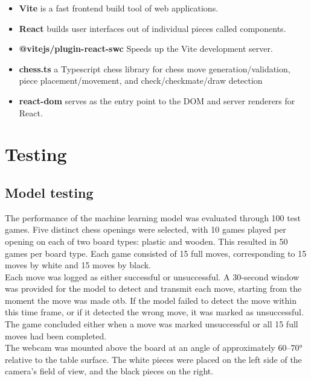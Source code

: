 \begin{itemize}
    \item \textbf{Vite} is a fast frontend build tool of web applications. \cite{ts:vite}
    
    \item \textbf{React} builds user interfaces out of individual pieces called components. \cite{ts:react}
    
    \item \textbf{@vitejs/plugin-react-swc} Speeds up the Vite development server. \cite{ts:swc}
    
    \item \textbf{chess.ts} a Typescript chess library for chess move generation/validation, piece placement/movement, and check/checkmate/draw detection \cite{ts:chess}
    
    \item \textbf{react-dom} serves as the entry point to the DOM and server renderers for React. \cite{ts:react-dom}
\end{itemize}

\section{Testing}
\label{sec:testing}

\subsection{Model testing}
\label{subsec:model-testing}

The performance of the machine learning model was evaluated through 100 test games. Five distinct chess openings were selected, with 10 games played per opening on each of two board types: plastic and wooden. This resulted in 50 games per board type. Each game consisted of 15 full moves, corresponding to 15 moves by white and 15 moves by black. \\

Each move was logged as either successful or unsuccessful. A 30-second window was provided for the model to detect and transmit each move, starting from the moment the move was made \gls{otb}. If the model failed to detect the move within this time frame, or if it detected the wrong move, it was marked as unsuccessful. The game concluded either when a move was marked unsuccessful or all 15 full moves had been completed. \\

The webcam was mounted above the board at an angle of approximately 60–70\si{\degree}
 relative to the table surface. The white pieces were placed on the left side of the camera's field of view, and the black pieces on the right.

